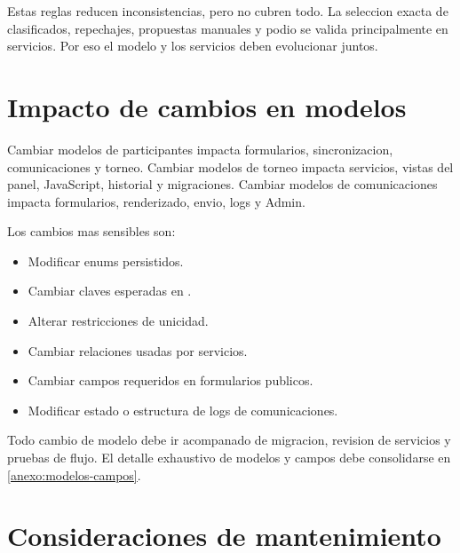 Estas reglas reducen inconsistencias, pero no cubren todo. La seleccion exacta de clasificados, repechajes, propuestas manuales y podio se valida principalmente en servicios. Por eso el modelo y los servicios deben evolucionar juntos.

\section{Impacto de cambios en modelos}
\label{sec:modelo-impacto-cambios}

Cambiar modelos de participantes impacta formularios, sincronizacion, comunicaciones y torneo. Cambiar modelos de torneo impacta servicios, vistas del panel, JavaScript, historial y migraciones. Cambiar modelos de comunicaciones impacta formularios, renderizado, envio, logs y Admin.

Los cambios mas sensibles son:

\begin{itemize}
  \item Modificar enums persistidos.
  \item Cambiar claves esperadas en .
  \item Alterar restricciones de unicidad.
  \item Cambiar relaciones  usadas por servicios.
  \item Cambiar campos requeridos en formularios publicos.
  \item Modificar estado o estructura de logs de comunicaciones.
\end{itemize}

Todo cambio de modelo debe ir acompanado de migracion, revision de servicios y pruebas de flujo. El detalle exhaustivo de modelos y campos debe consolidarse en \cref{anexo:modelos-campos}.

\section{Consideraciones de mantenimiento}
\label{sec:modelo-mantenimiento}

